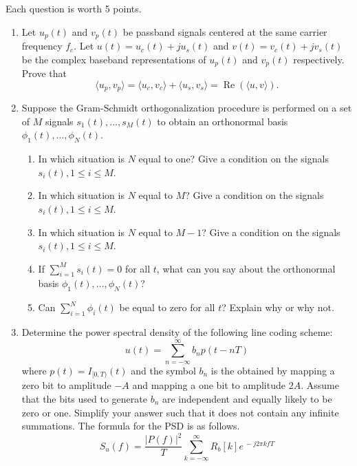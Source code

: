 \documentclass[10pt]{report}
\renewcommand\Re{\operatorname{Re}}
\begin{document}
Each question is worth 5 points.
\begin{enumerate}
  \item Let $u_p(t)$ and $v_p(t)$ be passband signals centered at the same carrier frequency $f_c$. Let $u(t) = u_c(t)+ju_s(t)$ and $v(t) = v_c(t) + jv_s(t)$ be the complex baseband representations of $u_p(t)$ and $v_p(t)$ respectively. Prove that
  \begin{equation*}
    \langle u_p,v_p \rangle = \langle u_c,v_c \rangle + \langle u_s,v_s \rangle = \Re\left(\langle u,v \rangle\right).
  \end{equation*}
  \item Suppose the Gram-Schmidt orthogonalization procedure is performed on a set of $M$ signals $s_1(t), \ldots, s_M(t)$ to obtain an orthonormal basis $\phi_1(t), \ldots, \phi_N(t)$.
  \begin{enumerate}
    \item In which situation is $N$ equal to one? Give a condition on the signals $s_i(t), 1 \leq i \leq M$.
    \item In which situation is $N$ equal to $M$? Give a condition on the signals $s_i(t), 1 \leq i \leq M$.
    \item In which situation is $N$ equal to $M-1$? Give a condition on the signals $s_i(t), 1 \leq i \leq M$.
    \item If $\sum_{i=1}^M s_i(t) = 0$ for all $t$, what can you say about the orthonormal basis $\phi_1(t), \ldots, \phi_N(t)$?
    \item Can $\sum_{i=1}^N \phi_i(t)$ be equal to zero for all $t$? Explain why or why not.
  \end{enumerate}
  \item Determine the power spectral density of the following line coding scheme:
    \begin{equation*}
      u(t) = \sum_{n=-\infty}^{\infty} b_n p(t-nT)
    \end{equation*}
    where $p(t) = I_{[0,T)}(t)$ and the symbol $b_n$ is the obtained by mapping a zero bit to amplitude $-A$ and mapping a one bit to amplitude $2A$. Assume that the bits used to generate $b_n$ are independent and equally likely to be zero or one. Simplify your answer such that it does not contain any infinite summations. The formula for the PSD is as follows.
    \begin{equation*}
      S_u(f) = \frac{\lvert P(f)\rvert^2}{T}\sum_{k=-\infty}^{\infty} R_b[k] e^{\ -j2\pi kfT}
    \end{equation*}

\end{enumerate}
\end{document}
